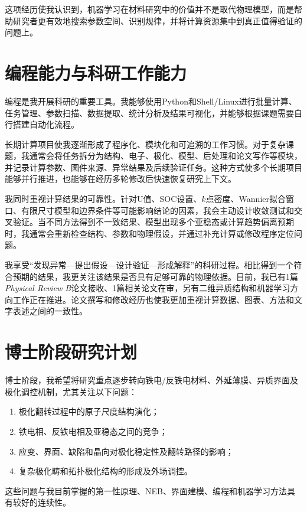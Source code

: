 这项经历使我认识到，机器学习在材料研究中的价值并不是取代物理模型，而是帮助研究者更有效地搜索参数空间、识别规律，并将计算资源集中到真正值得验证的问题上。

\section{编程能力与科研工作能力}

编程是我开展科研的重要工具。我能够使用Python和Shell/Linux进行批量计算、任务管理、参数扫描、数据提取、统计分析及结果可视化，并能够根据课题需要自行搭建自动化流程。

长期计算项目使我逐渐形成了程序化、模块化和可追溯的工作习惯。对于复杂课题，我通常会将任务拆分为结构、电子、极化、模型、后处理和论文写作等模块，并记录计算参数、图件来源、异常结果及后续验证任务。这种方式使多个长期项目能够并行推进，也能够在经历多轮修改后快速恢复研究上下文。

我同时重视计算结果的可靠性。针对U值、SOC设置、$k$点密度、Wannier拟合窗口、有限尺寸模型和边界条件等可能影响结论的因素，我会主动设计收敛测试和交叉验证。当不同方法得到不一致结果、模型出现多个亚稳态或计算趋势偏离预期时，我通常会重新检查结构、参数和物理假设，并通过补充计算或修改程序定位问题。

我享受“发现异常—提出假设—设计验证—形成解释”的科研过程。相比得到一个符合预期的结果，我更关注该结果是否具有足够可靠的物理依据。目前，我已有1篇\textit{Physical Review B}论文接收、1篇相关论文在审，另有二维异质结构和机器学习方向工作正在推进。论文撰写和修改经历也使我更加重视计算数据、图表、方法和文字表述之间的一致性。

\section{博士阶段研究计划}

博士阶段，我希望将研究重点逐步转向铁电/反铁电材料、外延薄膜、异质界面及极化调控机制，尤其关注以下问题：
\begin{enumerate}[label=\arabic*.,leftmargin=2.2em,itemsep=0.05em,topsep=0.15em]
  \item 极化翻转过程中的原子尺度结构演化；
  \item 铁电相、反铁电相及亚稳态之间的竞争；
  \item 应变、界面、缺陷和晶向对极化稳定性及翻转路径的影响；
  \item 复杂极化畴和拓扑极化结构的形成及外场调控。
\end{enumerate}
这些问题与我目前掌握的第一性原理、NEB、界面建模、编程和机器学习方法具有较好的连续性。

